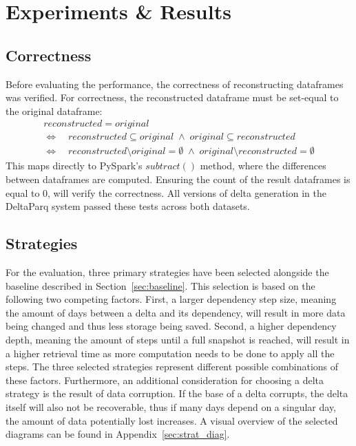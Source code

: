 \section{Experiments \& Results}


\subsection{Correctness}

Before evaluating the performance, the correctness of reconstructing dataframes was verified. For correctness, the reconstructed 
dataframe must be set-equal to the original dataframe:
\begin{gather*}
    reconstructed = original \\
    \Leftrightarrow\quad reconstructed \subseteq original \;\wedge\; original \subseteq reconstructed \\
    \Leftrightarrow\quad reconstructed \setminus original = \emptyset \;\wedge\; original \setminus reconstructed = \emptyset
\end{gather*}
This maps directly to PySpark's $subtract()$ method, where the differences between dataframes 
are computed. Ensuring the count of the result dataframes is equal to 0, will verify the correctness.
All versions of delta generation in the DeltaParq system passed these tests across both datasets.


\subsection{Strategies}

For the evaluation, three primary strategies have been selected alongside the baseline described in Section~\ref{sec:baseline}. 
This selection is based on the following two competing factors. First, a larger dependency step size, meaning the amount of 
days between a delta and its dependency, will result in more data being changed and thus less storage being saved. 
Second, a higher dependency depth, meaning the amount of steps until a full snapshot is reached, will result in a higher 
retrieval time as more computation needs to be done to apply all the steps. The three selected strategies represent 
different possible combinations of these factors. Furthermore, an additional consideration for choosing a delta strategy
is the result of data corruption. If the base of a delta corrupts, the delta itself will also not be recoverable, 
thus if many days depend on a singular day, the amount of data potentially lost increases. 
A visual overview of the selected diagrams can be found in Appendix~\ref{sec:strat_diag}.

